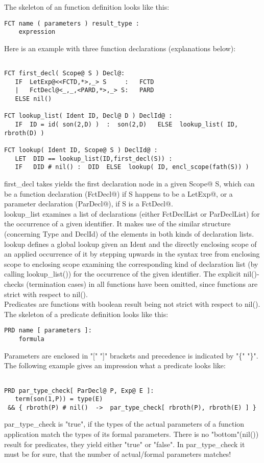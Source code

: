The skeleton of an function definition looks like this:
\begin{verbatim}
FCT name ( parameters ) result_type :
    expression
\end{verbatim}
Here is an example with three function declarations (explanations below):
\begin{verbatim}

FCT first_decl( Scope@ S ) Decl@:
   IF  LetExp@<<FCTD,*>,_> S     :   FCTD
   |   FctDecl@<_,_,<PARD,*>,_> S:   PARD
   ELSE nil()

FCT lookup_list( Ident ID, Decl@ D ) DeclId@ :
   IF  ID = id( son(2,D) )  :  son(2,D)   ELSE  lookup_list( ID, rbroth(D) )

FCT lookup( Ident ID, Scope@ S ) DeclId@ :
   LET  DID == lookup_list(ID,first_decl(S)) :
   IF   DID # nil() :  DID  ELSE  lookup( ID, encl_scope(fath(S)) )

\end{verbatim}
first\_decl takes yields the first declaration node in a given Scope@ S, which can
be a function declaration (FctDecl@) if S happens to be a LetExp@, or a parameter
declaration (ParDecl@), if S is a FctDecl@.\\
lookup\_list examines a list of declarations (either FctDeclList or ParDeclList) for the occurrence of a given identifier. It makes use of the similar structure (concerning Type and DeclId) of the elements in both kinds of declaration lists.\\
lookup defines a global lookup given an Ident and the directly enclosing scope of an applied occurrence of it by stepping upwards in the syntax tree from enclosing scope to enclosing scope examining the corresponding kind of declaration list (by calling lookup\_list()) for the occurrence of the given identifier. The explicit nil()-checks (termination cases) in all functions have been omitted, since functions are strict with respect to nil().\\
\noindent
Predicates are functions with boolean result being not strict with respect to nil(). The skeleton of a predicate definition looks like this:
\begin{verbatim}
PRD name [ parameters ]:
    formula
\end{verbatim}
\noindent
Parameters are enclosed in "[" "]" brackets and precedence is indicated by "\{" "\}".
The following example gives an impression what a predicate looks like:
\begin{verbatim}

PRD par_type_check[ ParDecl@ P, Exp@ E ]:
   term(son(1,P)) = type(E)
 && { rbroth(P) # nil()  ->  par_type_check[ rbroth(P), rbroth(E) ] }

\end{verbatim}
par\_type\_check is "true", if the types of the actual parameters of a function application match the types of its formal parameters. There is no "bottom"(nil()) result for predicates, they yield either "true" or "false". In par\_type\_check it must be for sure, that the number of actual/formal parameters matches!

